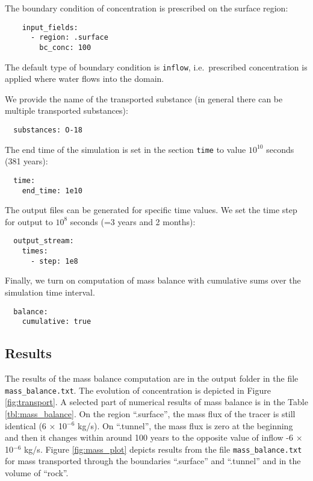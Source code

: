 The boundary condition of concentration is prescribed on the surface
region:

\begin{verbatim}
    input_fields:
      - region: .surface
        bc_conc: 100
\end{verbatim}

The default type of boundary condition is \texttt{inflow},
i.e.~prescribed concentration is applied where water flows into the
domain.

We provide the name of the transported substance (in general there can
be multiple transported substances):

\begin{verbatim}
  substances: O-18
\end{verbatim}

The end time of the simulation is set in the section \texttt{time} to
value \(10^{10}\) seconds (381 years):

\begin{verbatim}
  time:
    end_time: 1e10
\end{verbatim}

The output files can be generated for specific time values. We set the
time step for output to \(10^8\) seconds (=3 years and 2 months):

\begin{verbatim}
  output_stream:
    times:
      - step: 1e8
\end{verbatim}

Finally, we turn on computation of mass balance with cumulative sums
over the simulation time interval.

\begin{verbatim}
  balance:
    cumulative: true
\end{verbatim}

\subsection{Results}

The results of the mass balance computation are in the output folder in
the file \texttt{mass\_balance.txt}. The evolution of concentration is
depicted in Figure \ref{fig:transport}. A selected part of numerical
results of mass balance is in the Table \ref{tbl:mass_balance}. On the
region ``.surface'', the mass flux of the tracer is still identical (6 ×
10\({}^{-6}\) kg/s). On ``.tunnel'', the mass flux is zero at the
beginning and then it changes within around 100 years to the opposite
value of inflow -6 × 10\({}^{-6}\) kg/s. Figure \ref{fig:mass_plot}
depicts results from the file \texttt{mass\_balance.txt} for mass
transported through the boundaries ``.surface'' and ``.tunnel'' and in
the volume of ``rock''.

